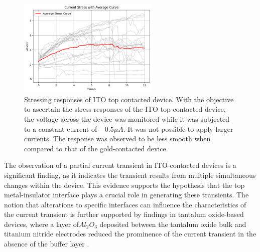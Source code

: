 \begin{figure}[htbp!] 
    \centering    
    \includegraphics[width=0.6\textwidth]{Chapter5/Figs/a.png}
    \caption[Stressing responses of ITO top contacted device.]{Stressing responses of ITO top contacted device. With the objective to ascertain the stress responses of the ITO top-contacted device, the voltage across the device was monitored while it was subjected to a constant current of $-0.5\mu A$. It was not possible to apply larger currents. The response was observed to be less smooth when compared to that of the gold-contacted device.}
    \label{fig:5a}
    \end{figure}



\noindent The observation of a partial current transient in ITO-contacted devices is a significant finding, as it indicates the transient results from multiple simultaneous changes within the device. This evidence supports the hypothesis that the top metal-insulator interface plays a crucial role in generating these transients. The notion that alterations to specific interfaces can influence the characteristics of the current transient is further supported by findings in tantalum oxide-based devices, where a layer of$Al_2O_3$ deposited between the tantalum oxide bulk and titanium nitride electrodes reduced the prominence of the current transient in the absence of the buffer layer \cite{tuller2011point}.\\

